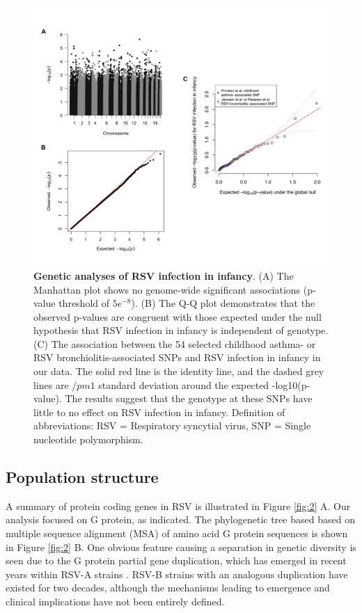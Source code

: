 \documentclass{article} %
\begin{document}
\begin{figure}[ht] \hspace{-0.5cm}
\begin{center}
    \includegraphics[scale=0.07]{host_genetics}
\end{center} 
	\caption{\textbf{Genetic analyses of RSV infection in infancy}.
		(A) The Manhattan plot shows no genome-wide significant associations (p-value threshold of $5e^{-8}$).
		(B) The Q-Q plot demonstrates that the observed p-values are congruent with those expected under the null hypothesis that RSV infection in infancy is independent of genotype. 
		(C) The association between the 54 selected childhood asthma- or RSV bronchiolitis-associated SNPs and RSV infection in infancy in our data. 
		The solid red line is the identity line, and the dashed grey lines are $/pm 1$ standard deviation around the expected -log10(p-value). 
		The results suggest that the genotype at these SNPs have little to no effect on RSV infection in infancy. 
		Definition of abbreviations: RSV = Respiratory syncytial virus, SNP = Single nucleotide polymorphism.
	}
	\label{fig:host_genetics} 
\end{figure}
\clearpage

\subsection{Population structure}
A summary of protein coding genes in RSV is illustrated in
Figure \ref{fig:2} A.
Our analysis focused on G protein, as indicated.
The phylogenetic tree based based on multiple sequence alignment (MSA) of amino acid G protein sequences is shown in 
Figure \ref{fig:2} B.
One obvious feature causing a separation in genetic diversity is seen due to the G protein partial gene duplication, 
which has emerged in recent years within RSV-A strains 
\cite{eshaghi2012genetic}.
RSV-B strains with an analogous duplication have existed for two decades, 
although the mechanisms leading to emergence and clinical implications have not been entirely defined.
\end{document}
